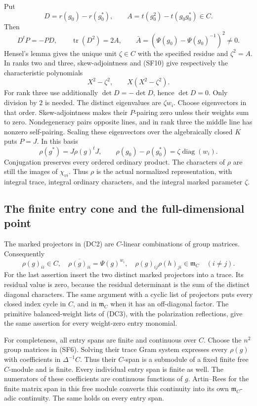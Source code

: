 Put
\[
 D=r(g_0)-r(g_0^*),\qquad
 A=t(g_0^2)-t(g_0g_0^*)\in C .
\]
Then
\[
       D^tP=-PD,\qquad \operatorname{tr}(D^2)=2A,\qquad
       \bar A=(\Psi(g_0)-\Psi(g_0)^{-1})^2\ne0 .
                                                               \tag{SF10}
\]
Hensel's lemma gives the unique unit \(\zeta\in C\)
with the specified residue and \(\zeta^2=A\).
In ranks two and three, skew-adjointness and (SF10)
give respectively the characteristic polynomials
\[
                       X^2-\zeta^2,\qquad X(X^2-\zeta^2).
\]
For rank three use additionally
\(\det D=-\det D\), hence \(\det D=0\).
Only division by \(2\) is needed.
The distinct eigenvalues are \(\zeta w_i\).
Choose eigenvectors in that order.
Skew-adjointness makes their \(P\)-pairing zero
unless their weights sum to zero.
Nondegeneracy pairs opposite lines, and in rank
three the middle line has nonzero self-pairing.
Scaling these eigenvectors over the algebraically
closed \(K\) puts \(P=J\).
In this basis
\[
 \rho(g^*)=J\rho(g)^tJ,\qquad
 \rho(g_0)-\rho(g_0^*)=\zeta\operatorname{diag}(w_i).
                                                               \tag{SF11}
\]
Conjugation preserves every ordered ordinary product.
The characters of \(\rho\) are still the images of
\(\chi_{vi}\).
Thus \(\rho\) is the actual normalized representation,
with integral trace, integral ordinary characters,
and the integral marked parameter \(\zeta\).

\subsection{The finite entry cone and the full-dimensional point}
The marked projectors in (DC2) are \(C\)-linear
combinations of group matrices.
Consequently
\[
 \rho(g)_{ii}\in C,\quad
 \overline{\rho(g)_{ii}}=\Psi(g)^{w_i},\quad
 \rho(g)_{ij}\rho(h)_{ji}\in\mathfrak m_C\quad(i\ne j).
                                                               \tag{SF12}
\]
For the last assertion insert the two distinct marked
projectors into a trace. Its residual value is zero,
because the residual determinant is the sum of the
distinct diagonal characters.
The same argument with a cyclic list of projectors
puts every closed index cycle in \(C\), and in
\(\mathfrak m_C\) when it has an off-diagonal factor.
The primitive balanced-weight lists of (DC3), with
the polarization reflections, give the same assertion
for every weight-zero entry monomial.

For completeness, all entry spans are finite and
continuous over \(C\). Choose the \(n^2\) group
matrices in (SF6). Solving their trace Gram system
expresses every \(\rho(g)\) with coefficients in
\(\Delta^{-1}C\). Thus their \(C\)-span is a submodule
of a fixed finite free \(C\)-module and is finite.
Every individual entry span is finite as well.
The numerators of these coefficients are continuous
functions of \(g\). Artin--Rees for the finite
matrix span in this free module converts this
continuity into its own \(\mathfrak m_C\)-adic
continuity. The same holds on every entry span.

